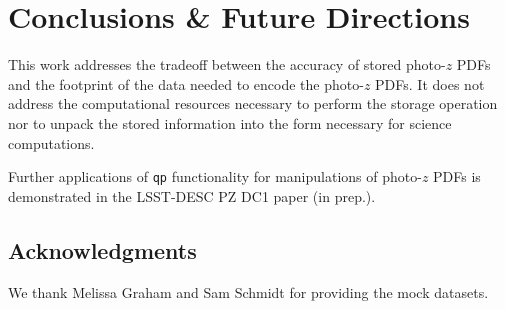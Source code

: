 \documentclass[\docopts]{\docclass}
\begin{document}

\section{Conclusions \& Future Directions}
\label{sec:conclusions}

%
%


This work addresses the tradeoff between the accuracy of stored photo-$z$ PDFs and the footprint of the data needed to encode the photo-$z$ PDFs.  It does not address the computational resources necessary to perform the storage operation nor to unpack the stored information into the form necessary for science computations.

Further applications of \texttt{qp} functionality for manipulations of photo-$z$ PDFs is demonstrated in the LSST-DESC PZ DC1 paper (in prep.).

\subsection*{Acknowledgments}


We thank Melissa Graham and Sam Schmidt for providing the mock datasets.







%
\end{document}
